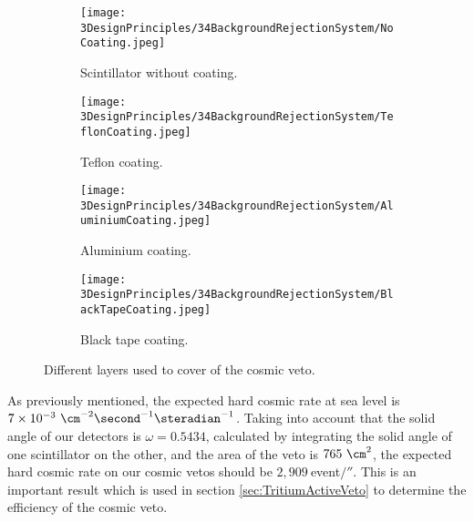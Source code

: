 \begin{figure}
\centering
    \begin{subfigure}[b]{0.23\textwidth}
    \centering
    \texttt{[image: 3DesignPrinciples/34BackgroundRejectionSystem/NoCoating.jpeg]}  
    \caption{Scintillator without coating.\label{subfig:PlasticScintillatorNoCoating}}
    \end{subfigure}
    \hfill
    \begin{subfigure}[b]{0.23\textwidth}
    \centering
    \texttt{[image: 3DesignPrinciples/34BackgroundRejectionSystem/TeflonCoating.jpeg]}  
    \caption{Teflon coating.\label{subfig:PlasticScintillatorTeflon}}
    \end{subfigure}
    \hfill
    \begin{subfigure}[b]{0.23\textwidth}
    \centering
    \texttt{[image: 3DesignPrinciples/34BackgroundRejectionSystem/AluminiumCoating.jpeg]}  
    \caption{Aluminium coating.\label{subfig:PlasticScintillatorAluminium}}
    \end{subfigure}
    \hfill
    \begin{subfigure}[b]{0.23\textwidth}
    \centering
    \texttt{[image: 3DesignPrinciples/34BackgroundRejectionSystem/BlackTapeCoating.jpeg]}  
    \caption{Black tape coating.\label{subfig:PlasticScintillatorBlackTape}}
    \end{subfigure}
 \caption{Different layers used to cover of the cosmic veto.}
 \label{fig:LayersVeto}
\end{figure}

As previously mentioned, the expected hard cosmic rate at sea level is $7 \times 10^{-3}~\cm^{-2}\second^{-1}\steradian^{-1}$. Taking into account that the solid angle of our detectors is $\omega=0.5434$, calculated by integrating the solid angle of one scintillator on the other, and the area of the veto is $765~\cm^2$, the expected hard cosmic rate on our cosmic vetos should be $2,909~$event$/\second$. This is an important result which is used in section \ref{sec:TritiumActiveVeto} to determine the efficiency of the cosmic veto.